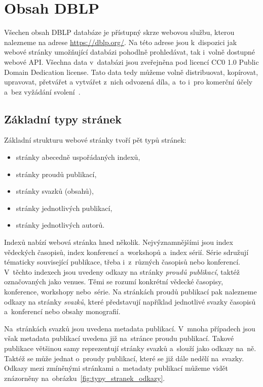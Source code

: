 \documentclass[
  biblatex,
  sourcecodes,
  glossaries,
  index
]{kidiplom}
\begin{document}
\newpage

\section{Obsah DBLP}

Všechen obsah DBLP databáze je přístupný skrze webovou službu, kterou nalezneme na adrese \href{https://dblp.org/}{https://dblp.org/}. Na této adrese jsou k~dispozici jak webové stránky umožňující databázi pohodlně prohledávat, tak i~volně dostupné webové API. Všechna data v~databázi jsou zveřejněna pod licencí CC0 1.0 Public Domain Dedication license. Tato data tedy můžeme volně distribuovat, kopírovat, upravovat, přetvářet a vytvářet z~nich odvozená díla, a~to i~pro komerční účely a~bez vyžádání svolení~\cite{t01}.

\subsection{Základní typy stránek}

Základní strukturu webové stránky tvoří pět typů stránek:
\begin{itemize}
\item stránky abecedně uspořádaných indexů,
\item stránky proudů publikací,
\item stránky svazků (obsahů),
\item stránky jednotlivých publikací,
\item stránky jednotlivých autorů.
\end{itemize}

Indexů nabízí webová stránka hned několik. Nejvýznamnějšími jsou index vědeckých časopisů, index konferencí a~workshopů a~index sérií. Série sdružují tématicky související publikace, třeba i~z~různých časopisů nebo konferencí. V~těchto indexech jsou uvedeny odkazy na stránky \textit{proudů publikací}, taktéž označovaných jako venues. Těmi se rozumí konkrétní vědecké časopisy, konference, workshopy nebo~série. Na stránkách proudů publikací pak nalezneme odkazy na stránky \textit{svazků}, které představují například jednotlivé svazky časopisů a~konferencí nebo obsahy monografií.

Na~stránkách svazků jsou uvedena metadata publikací. V~mnoha případech jsou však metadata publikací uvedena již na~stránce proudu publikací. Takové publikace většinou samy reprezentují stránky svazků a~slouží jako odkazy na~ně. Taktéž se může jednat o~proudy publikací, které se již dále nedělí na~svazky. Odkazy mezi zmíněnými stránkami a~metadaty publikací můžeme vidět znázorněny na~obrázku~\ref{fig:typy_stranek_odkazy}.
\end{document}
